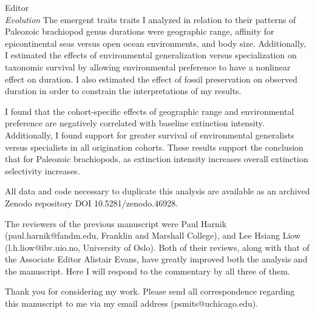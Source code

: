 \documentclass{letter}
\begin{document}
\begin{letter}{Editor \\ \textit{Evolution}}
  The emergent traits traits I analyzed in relation to their patterns of Paleozoic brachiopod genus durations were geographic range, affinity for epicontinental seas versus open ocean environments, and body size. Additionally, I estimated the effects of environmental generalization versus specialization on taxonomic survival by allowing environmental preference to have a nonlinear effect on duration. I also estimated the effect of fossil preservation on observed duration in order to constrain the interpretations of my results. 
  
  I found that the cohort-specific effects of geographic range and environmental preference are negatively correlated with baseline extinction intensity. Additionally, I found support for greater survival of environmental generalists versus specialists in all origination cohorts. These results support the conclusion that for Paleozoic brachiopods, as extinction intensity increases overall extinction selectivity increases.

  All data and code necessary to duplicate this analysis are available as an archived Zenodo repository DOI 10.5281/zenodo.46928.

  The reviewers of the previous manuscript were Paul Harnik (paul.harnik@fandm.edu, Franklin and Marshall College), and Lee Hsiang Liow (l.h.liow@ibv.uio.no, University of Oslo). Both of their reviews, along with that of the Associate Editor Alistair Evans, have greatly improved both the analysis and the manuscript. Here I will respond to the commentary by all three of them.
  
  Thank you for considering my work. Please send all correspondence regarding this manuscript to me via my email address (psmits@uchicago.edu).


  \clearpage


\end{letter}
\end{document}
